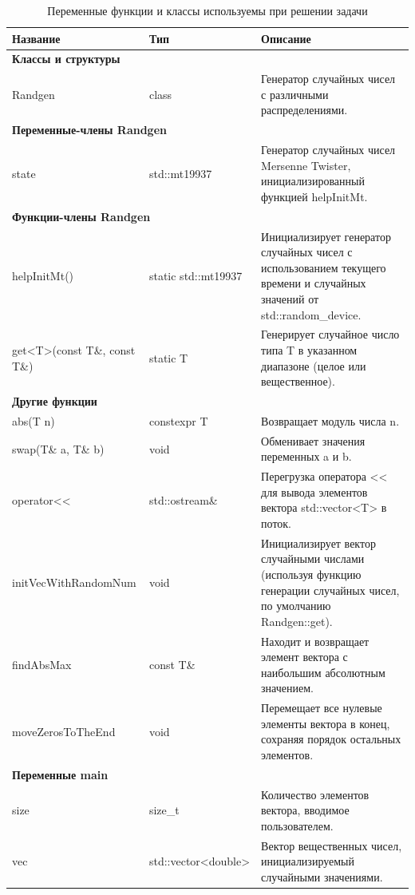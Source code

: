 \documentclass[14pt,a4paper]{article}
\begin{document}
\begin{table}[H]
  \centering
  \begin{tabular}{|l|l|p{8cm}|} \hline
    \textbf{Название} & \textbf{Тип} & \textbf{Описание} \\ \hline
    \multicolumn{3}{|l|}{\textbf{Классы и структуры}} \\ \hline
    Randgen & class & Генератор случайных чисел с различными распределениями. \\ \hline
    \multicolumn{3}{|l|}{\textbf{Переменные-члены Randgen}} \\ \hline
    state & std::mt19937 & Генератор случайных чисел Mersenne Twister, инициализированный функцией helpInitMt. \\ \hline
    \multicolumn{3}{|l|}{\textbf{Функции-члены Randgen}} \\ \hline
    helpInitMt() & static std::mt19937 & Инициализирует генератор случайных чисел с использованием текущего времени и случайных значений от std::random\_device. \\ \hline
    get<T>(const T\&, const T\&) & static T & Генерирует случайное число типа T в указанном диапазоне (целое или вещественное). \\ \hline
    \multicolumn{3}{|l|}{\textbf{Другие функции}} \\ \hline
    abs(T n) & constexpr T & Возвращает модуль числа n. \\ \hline
    swap(T\& a, T\& b) & void & Обменивает значения переменных a и b. \\ \hline
    operator<< & std::ostream\& & Перегрузка оператора << для вывода элементов вектора std::vector<T> в поток. \\ \hline
    initVecWithRandomNum & void & Инициализирует вектор случайными числами (используя функцию генерации случайных чисел, по умолчанию Randgen::get). \\ \hline
    findAbsMax & const T\& & Находит и возвращает элемент вектора с наибольшим абсолютным значением. \\ \hline
    moveZerosToTheEnd & void & Перемещает все нулевые элементы вектора в конец, сохраняя порядок остальных элементов. \\ \hline
    \multicolumn{3}{|l|}{\textbf{Переменные main}} \\ \hline
    size & size\_t & Количество элементов вектора, вводимое пользователем. \\ \hline
    vec & std::vector<double> & Вектор вещественных чисел, инициализируемый случайными значениями. \\ \hline
  \end{tabular}
  \caption{Переменные функции и классы используемы при решении задачи}
  \label{tabel:1}
\end{table}
\end{document}
